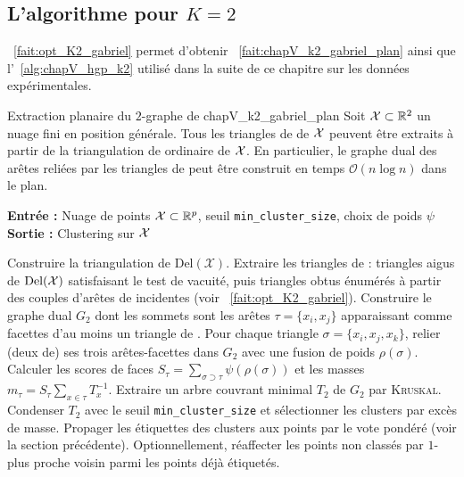 \subsection{L'algorithme pour $K=2$}

\Fact~\ref{fait:opt_K2_gabriel} permet d'obtenir \Fact~\ref{fait:chapV_k2_gabriel_plan} ainsi que l'\Alg~\ref{alg:chapV_hgp_k2} utilisé dans la suite de ce chapitre sur les données expérimentales. 

\begin{Fait}{Extraction planaire du \(2\)-graphe de  \cite{BibiAppliedNetworkScience}}{chapV_k2_gabriel_plan}
Soit $\mathcal{X}\subset\mathbb R^2$ un nuage fini en position générale. Tous les triangles de  de $\mathcal{X}$ peuvent être extraits à partir de la triangulation de  ordinaire de $\mathcal{X}$. En particulier, le graphe dual des arêtes reliées par les triangles de  peut être construit en temps $\mathcal O(n\log n)$ dans le plan.
\end{Fait}



\begin{algorithm}[htbp]
  \caption{\textsc{HGP-Clusterer} pour $K=2$ avec sortie en partition stricte}\label{alg:chapV_hgp_k2}
  \textbf{Entrée :} Nuage de points $\mathcal{X}\subset\mathbb R^p$, seuil \texttt{min\_cluster\_size}, choix de poids $\psi$\\
  \textbf{Sortie :} Clustering sur $\mathcal{X}$
  \begin{algorithmic}[1]
    \State Construire la triangulation de  $\mathrm{Del}(\mathcal X)$.
    \State Extraire les triangles de  : triangles aigus de $\mathrm{Del}(\mathcal{X})$ satisfaisant le test de vacuité, puis triangles obtus énumérés à partir des couples d'arêtes de  incidentes (voir \Fact~\ref{fait:opt_K2_gabriel}).
    \State Construire le graphe dual $G_2$ dont les sommets sont les arêtes $\tau=\{x_i,x_j\}$ apparaissant comme facettes d'au moins un triangle de .
    \State Pour chaque triangle $\sigma=\{x_i,x_j,x_k\}$, relier (deux de) ses trois arêtes-facettes dans $G_2$ avec une fusion de poids $\rho(\sigma)$.
    \State Calculer les scores de faces $S_\tau=\sum_{\sigma\supset\tau}\psi(\rho(\sigma))$ et les masses $m_\tau=S_\tau\sum_{x\in\tau}T_x^{-1}$.
    \State Extraire un arbre couvrant minimal $T_2$ de $G_2$ par \textsc{Kruskal}.
    \State Condenser $T_2$ avec le seuil \texttt{min\_cluster\_size} \cite{HDBSCAN2017} et sélectionner les clusters par excès de masse.
    \State Propager les étiquettes des clusters aux points par le vote pondéré (voir la section précédente).
    \State Optionnellement, réaffecter les points non classés par $1$-plus proche voisin parmi les points déjà étiquetés.
  \end{algorithmic}
\end{algorithm}


